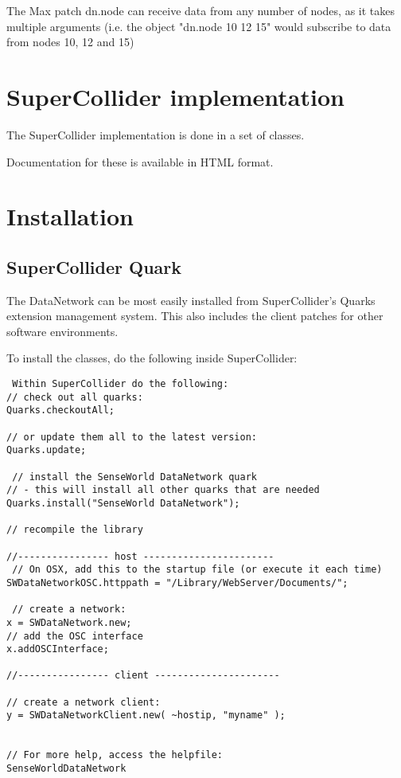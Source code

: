 \documentclass[letterpaper,10pt]{article}
\begin{document}
The Max patch dn.node can receive data from any number of nodes, as it takes multiple arguments (i.e. the object "dn.node 10 12 15" would subscribe to data from nodes 10, 12 and 15)

\section{SuperCollider implementation}

The SuperCollider implementation is done in a set of classes.

Documentation for these is available in HTML format.

\section{Installation}

\subsection{SuperCollider Quark}

The DataNetwork can be most easily installed from SuperCollider's Quarks extension management system.
This also includes the client patches for other software environments.

To install the classes, do the following inside SuperCollider:

\begin{verbatim}
 Within SuperCollider do the following:
// check out all quarks:
Quarks.checkoutAll;

// or update them all to the latest version:
Quarks.update;

 // install the SenseWorld DataNetwork quark
// - this will install all other quarks that are needed
Quarks.install("SenseWorld DataNetwork");

// recompile the library 

//---------------- host -----------------------
 // On OSX, add this to the startup file (or execute it each time)
SWDataNetworkOSC.httppath = "/Library/WebServer/Documents/";

 // create a network:
x = SWDataNetwork.new;
// add the OSC interface
x.addOSCInterface;

//---------------- client ----------------------

// create a network client:
y = SWDataNetworkClient.new( ~hostip, "myname" );

 
// For more help, access the helpfile:
SenseWorldDataNetwork
\end{verbatim}
\end{document}
